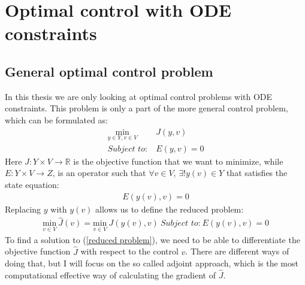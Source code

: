 \chapter{Optimal control with ODE constraints}
\section{General optimal control problem}
In this thesis we are only looking at optimal control problems with ODE constraints. This problem is only a part of the more general control problem, which can be formulated as:
\begin{align}
\underset{y\in Y,v\in V}{\text{min}} \ &J(y,v) \\
\textit{Subject to:} \ &E(y,v)=0
\end{align}
Here $J: Y\times V\rightarrow\mathbb{R}$ is the objective function that we want to minimize, while $E:Y\times V \rightarrow Z$, is an operator such that $\forall v \in V$, $\exists! y(v)\in Y$ that satisfies the state equation:
\begin{align*}
E(y(v),v)=0
\end{align*}
Replacing $y$ with $y(v)$ allows us to define the reduced problem:
\begin{align}
\underset{v\in V}{\text{min}} \ \hat J(v)=\underset{v\in V}{\text{min}} \ J(y(v),v) \ \textit{Subject to:} \ E(y(v),v)=0 \label{reduced problem}
\end{align}
To find a solution to (\ref{reduced problem}), we need to be able to differentiate the objective function $\hat{J}$ with respect to the control $v$. There are different ways of doing that, but I will focus on the so called adjoint approach, which is the most computational effective way of calculating the gradient of $\hat{J}$.
